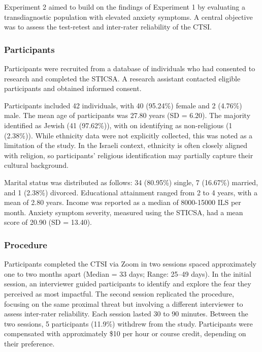 \documentclass[
  man,floatsintext]{apa7}
\begin{document}
Experiment 2 aimed to build on the findings of Experiment 1 by evaluating a transdiagnostic population with elevated anxiety symptoms.
A central objective was to assess the test-retest and inter-rater reliability of the CTSI.

\subsubsection{Participants}\label{participants-1}

Participants were recruited from a database of individuals who had consented to research and completed the STICSA.
A research assistant contacted eligible participants and obtained informed consent.

Participants included 42 individuals, with 40 (95.24\%) female and 2 (4.76\%) male.
The mean age of participants was 27.80 years (SD = 6.20).
The majority identified as Jewish (41 (97.62\%)), with on identifying as non-religious (1 (2.38\%)).
While ethnicity data were not explicitly collected, this was noted as a limitation of the study.
In the Israeli context, ethnicity is often closely aligned with religion, so participants' religious identification may partially capture their cultural background.

Marital status was distributed as follows: 34 (80.95\%) single, 7 (16.67\%) married, and 1 (2.38\%) divorced.
Educational attainment ranged from 2 to 4 years, with a mean of 2.80 years.
Income was reported as a median of 8000-15000 ILS per month.
Anxiety symptom severity, measured using the STICSA, had a mean score of 20.90 (SD = 13.40).

\subsubsection{Procedure}\label{procedure-1}

Participants completed the CTSI via Zoom in two sessions spaced approximately one to two months apart (Median = 33 days; Range: 25--49 days).
In the initial session, an interviewer guided participants to identify and explore the fear they perceived as most impactful.
The second session replicated the procedure, focusing on the same proximal threat but involving a different interviewer to assess inter-rater reliability.
Each session lasted 30 to 90 minutes.
Between the two sessions, 5 participants (11.9\%) withdrew from the study.
Participants were compensated with approximately \$10 per hour or course credit, depending on their preference.
\end{document}
